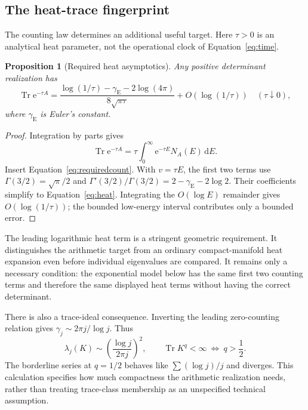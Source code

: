 \documentclass[11pt,letterpaper]{article}
\numberwithin{equation}{section}
\newtheorem{proposition}[theorem]{Proposition}
\theoremstyle{definition}
\theoremstyle{remark}
\newcommand{\dd}{\,\mathrm d}
\newcommand{\e}{\mathrm e}
\DeclareMathOperator{\Tr}{Tr}
\begin{document}
\subsection{The heat-trace fingerprint}
The counting law determines an additional useful target. Here $\tau>0$ is an analytical heat parameter, not the operational clock of Equation~\eqref{eq:time}.

\begin{proposition}[Required heat asymptotics]
\label{prop:heat}
Any positive determinant realization has
\begin{equation}
 \Tr\e^{-\tau A}
 =\frac{\log(1/\tau)-\gamma_{\mathrm E}-2\log(4\pi)}
        {8\sqrt{\pi\tau}}
   +O\!\left(\log(1/\tau)\right)
 \quad(\tau\downarrow0),
 \label{eq:heat}
\end{equation}
where $\gamma_{\mathrm E}$ is Euler's constant.
\end{proposition}
\begin{proof}
Integration by parts gives
\[
 \Tr\e^{-\tau A}=\tau\int_0^\infty\e^{-\tau E}N_A(E)\dd E.
\]
Insert Equation~\eqref{eq:requiredcount}. With $v=\tau E$, the first two terms use $\Gamma(3/2)=\sqrt\pi/2$ and
$\Gamma'(3/2)/\Gamma(3/2)=2-\gamma_{\mathrm E}-2\log2$. Their coefficients simplify to Equation~\eqref{eq:heat}. Integrating the $O(\log E)$ remainder gives $O(\log(1/\tau))$; the bounded low-energy interval contributes only a bounded error.
\end{proof}

The leading logarithmic heat term is a stringent geometric requirement. It distinguishes the arithmetic target from an ordinary compact-manifold heat expansion even before individual eigenvalues are compared. It remains only a necessary condition: the exponential model below has the same first two counting terms and therefore the same displayed heat terms without having the correct determinant.

There is also a trace-ideal consequence. Inverting the leading zero-counting relation gives $\gamma_j\sim2\pi j/\log j$. Thus
\begin{equation}
 \lambda_j(K)\sim\left(\frac{\log j}{2\pi j}\right)^2,
 \qquad \Tr K^q<\infty\ \Longleftrightarrow\ q>\frac12.
 \label{eq:schatten}
\end{equation}
The borderline series at $q=1/2$ behaves like $\sum(\log j)/j$ and diverges. This calculation specifies how much compactness the arithmetic realization needs, rather than treating trace-class membership as an unspecified technical assumption.
\end{document}
